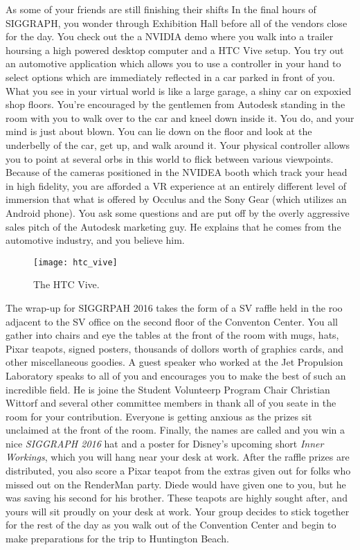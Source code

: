 \documentclass[../main.tex]{subfiles}
\begin{document}
As some of your friends are still finishing their shifts In the final hours of SIGGRAPH, you wonder through Exhibition Hall before all of the vendors close for the day. You check out the a NVIDIA demo where you walk into a trailer hoursing a high powered desktop computer and a HTC Vive setup. You try out an automotive application which allows you to use a controller in your hand to select options which are immediately reflected in a car parked in front of you. What you see in your virtual world is like a large garage, a shiny car on expoxied shop floors. You're encouraged by the gentlemen from Autodesk standing in the room with you to walk over to the car and kneel down inside it. You do, and your mind is just about blown. You can lie down on the floor and look at the underbelly of the car, get up, and walk around it. Your physical controller allows you to point at several orbs in this world to flick between various viewpoints. Because of the cameras positioned in the NVIDEA booth which track your head in high fidelity, you are afforded a VR experience at an entirely different level of immersion that what is offered by Occulus and the Sony Gear (which utilizes an Android phone). You ask some questions and are put off by the overly aggressive sales pitch of the Autodesk marketing guy. He explains that he comes from the automotive industry, and you believe him.

\begin{figure}[h!]
	\centering
	\texttt{[image: htc\_vive]}
	\caption*{The HTC Vive.}
\end{figure}

The wrap-up for SIGGRPAH 2016 takes the form of a SV raffle held in the roo adjacent to the SV office on the second floor of the Conventon Center. You all gather into chairs and eye the tables at the front of the room with mugs, hats, Pixar teapots, signed posters, thousands of dollors worth of graphics cards, and other miscellaneous goodies. A guest speaker who worked at the Jet Propulsion Laboratory speaks to all of you and encourages you to make the best of such an incredible field. He is joine the Student Volunteerp Program Chair Christian Wittorf and several other committee members in thank all of you seate in the room for your contribution. Everyone is getting anxious as the prizes sit unclaimed at the front of the room. Finally, the names are called and you win a nice \textit{SIGGRAPH 2016} hat and a poster for Disney's upcoming short \textit{Inner Workings}, which you will hang near your desk at work. After the raffle prizes are distributed, you also score a Pixar teapot from the extras given out for folks who missed out on the RenderMan party. Diede would have given one to you, but he was saving his second for his brother. These teapots are highly sought after, and yours will sit proudly on your desk at work. Your group decides to stick together for the rest of the day as you walk out of the Convention Center and begin to make preparations for the trip to Huntington Beach.
\end{document}
